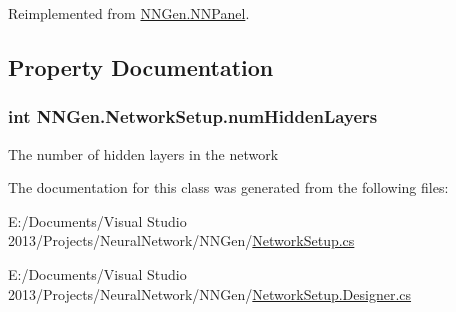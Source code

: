 Reimplemented from \hyperlink{class_n_n_gen_1_1_n_n_panel_a36e3bcf90c9e561e8502eac6f884582a}{N\+N\+Gen.\+N\+N\+Panel}.



\subsection{Property Documentation}
\hypertarget{class_n_n_gen_1_1_network_setup_a1a90afb18c0fbb167d46337505d8e63e}{}
\subsubsection[{num\+Hidden\+Layers}]{\setlength{\rightskip}{0pt plus 5cm}int N\+N\+Gen.\+Network\+Setup.\+num\+Hidden\+Layers\hspace{0.3cm}{\ttfamily [get]}}\label{class_n_n_gen_1_1_network_setup_a1a90afb18c0fbb167d46337505d8e63e}


The number of hidden layers in the network 



The documentation for this class was generated from the following files\+:\begin{DoxyCompactItemize}
\item 
E\+:/\+Documents/\+Visual Studio 2013/\+Projects/\+Neural\+Network/\+N\+N\+Gen/\hyperlink{_network_setup_8cs}{Network\+Setup.\+cs}\item 
E\+:/\+Documents/\+Visual Studio 2013/\+Projects/\+Neural\+Network/\+N\+N\+Gen/\hyperlink{_network_setup_8_designer_8cs}{Network\+Setup.\+Designer.\+cs}\end{DoxyCompactItemize}
